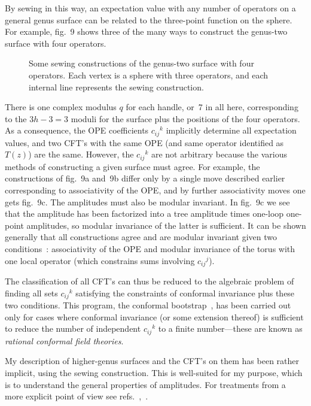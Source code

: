 By sewing in this way, an expectation value with any number of
operators on a general genus surface can be related to the
three-point function on the sphere.  For example, fig.~9 shows
three of the many ways to construct the genus-two surface with four
operators.
\begin{figure}
\begin{center}
\leavevmode
{}
\end{center}
\caption[]{Some sewing constructions of the genus-two surface with
four operators.  Each vertex is a sphere with three operators, and
each internal line represents the sewing construction.} 
\end{figure} 
There is one complex modulus $q$ for each
handle, or~7 in all here, corresponding to the $3h - 3 = 3$ moduli for
the surface plus the positions of the four operators.  As a
consequence, the OPE coefficients $c_{ij}\!^k$ implicitly determine all
expectation values, and two CFT's with the same OPE (and same operator
identified as $T(z)$) are the same.  However, the $c_{ij}\!^k$
are not arbitrary because the
various methods of constructing a given surface must agree.  For
example, the constructions of fig.~9a and~9b differ only by a single
move described earlier corresponding to associativity of the OPE,
and by further associativity moves one gets fig.~9c.
The amplitudes must also be modular invariant.  In fig.~9c we see
that the amplitude has been factorized into a tree amplitude times
one-loop one-point amplitudes, so  modular invariance of the latter
is sufficient.
It can be shown generally that all constructions
agree and are modular invariant
given two conditions~\cite{Son}: associativity of the OPE and modular
invariance of the torus with one local operator (which constrains
sums involving $c_{ij}\!^j$).
 
The classification of all CFT's can
thus be reduced to the algebraic problem of finding all sets
$c_{ij}\!^k$ satisfying the constraints of conformal invariance plus
these two conditions.  This program, the conformal
bootstrap~\cite{BPZ}, has been carried out only for cases where
conformal invariance (or some extension thereof) is sufficient to
reduce the number of independent $c_{ij}\!^k$ to a finite
number---these are known as {\it rational conformal field theories}.

My description of higher-genus surfaces and the CFT's on them has
been rather implicit, using the sewing construction.  This is
well-suited for my purpose, which is to understand the general
properties of amplitudes.  For treatments from a more explicit point
of view see refs.~\cite{Oalv},~\cite{DFrmp}. 

